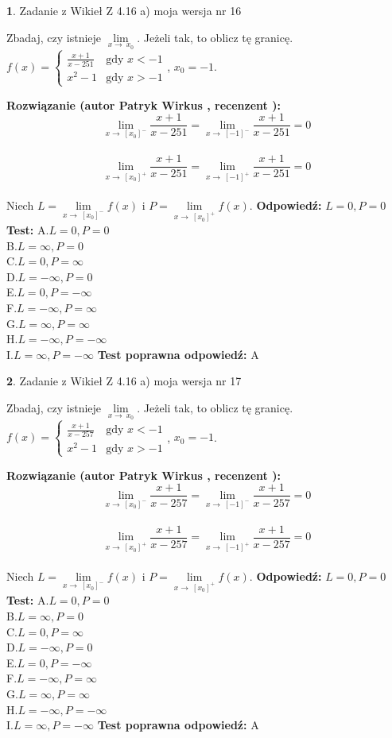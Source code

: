 \documentclass[12pt, a4paper]{article}
\theoremstyle{definition} %
\newtheorem{zad}{}
\newcommand{\zadStart}[1]{\begin{zad}#1\newline}
\newcommand{\zadStop}{\end{zad}}
\newcommand{\rozwStart}[2]{\noindent \textbf{Rozwiązanie (autor #1 , recenzent #2): }\newline}
\newcommand{\rozwStop}{\newline}
\newcommand{\odpStart}{\noindent \textbf{Odpowiedź:}\newline}
\newcommand{\odpStop}{\newline}
\newcommand{\testStart}{\noindent \textbf{Test:}\newline}
\newcommand{\testStop}{\newline}
\newcommand{\kluczStart}{\noindent \textbf{Test poprawna odpowiedź:}\newline}
\newcommand{\kluczStop}{\newline}
\begin{document}
\zadStart{Zadanie z Wikieł Z 4.16 a) moja wersja nr 16}

Zbadaj, czy istnieje $\lim\limits_{x\to\ x_{0}}$. Jeżeli tak, to oblicz tę granicę.\\   $f(x) = \left\{ \begin{array}{ll}
\frac{x+1}{x-251} & \textrm{gdy $x<-1$}\\
x^{2}-1 & \textrm{gdy $x>-1$}
\end{array} \right.$, $x_{0}=-1$.
\zadStop
\rozwStart{Patryk Wirkus}{}
$$\lim\limits_{x\to\ [x_{0}]^{-}}\frac{x+1}{x-251} = \lim\limits_{x\to\ [-1]^{-}}\frac{x+1}{x-251} = 0$$
\\
$$\lim\limits_{x\to\ [x_{0}]^{+}}\frac{x+1}{x-251} = \lim\limits_{x\to\ [-1]^{+}}\frac{x+1}{x-251} = 0$$
\\
Niech $L=\lim\limits_{x\to\ [x_{0}]^{-}}f(x)$ i $P=\lim\limits_{x\to\ [x_{0}]^{+}}f(x)$.
\rozwStop
\odpStart
$L=0, P=0$
\odpStop
\testStart
A.$L=0, P=0$\\ B.$L=\infty, P=0$\\ C.$L=0, P=\infty$\\ D.$L=-\infty, P=0$\\ E.$L=0, P=-\infty$\\
F.$L=-\infty, P=\infty$\\ G.$L=\infty, P=\infty$\\
H.$L=-\infty, P=-\infty$\\
I.$L=\infty, P=-\infty$
\testStop
\kluczStart
A
\kluczStop



\zadStart{Zadanie z Wikieł Z 4.16 a) moja wersja nr 17}

Zbadaj, czy istnieje $\lim\limits_{x\to\ x_{0}}$. Jeżeli tak, to oblicz tę granicę.\\   $f(x) = \left\{ \begin{array}{ll}
\frac{x+1}{x-257} & \textrm{gdy $x<-1$}\\
x^{2}-1 & \textrm{gdy $x>-1$}
\end{array} \right.$, $x_{0}=-1$.
\zadStop
\rozwStart{Patryk Wirkus}{}
$$\lim\limits_{x\to\ [x_{0}]^{-}}\frac{x+1}{x-257} = \lim\limits_{x\to\ [-1]^{-}}\frac{x+1}{x-257} = 0$$
\\
$$\lim\limits_{x\to\ [x_{0}]^{+}}\frac{x+1}{x-257} = \lim\limits_{x\to\ [-1]^{+}}\frac{x+1}{x-257} = 0$$
\\
Niech $L=\lim\limits_{x\to\ [x_{0}]^{-}}f(x)$ i $P=\lim\limits_{x\to\ [x_{0}]^{+}}f(x)$.
\rozwStop
\odpStart
$L=0, P=0$
\odpStop
\testStart
A.$L=0, P=0$\\ B.$L=\infty, P=0$\\ C.$L=0, P=\infty$\\ D.$L=-\infty, P=0$\\ E.$L=0, P=-\infty$\\
F.$L=-\infty, P=\infty$\\ G.$L=\infty, P=\infty$\\
H.$L=-\infty, P=-\infty$\\
I.$L=\infty, P=-\infty$
\testStop
\kluczStart
A
\kluczStop
\end{document}
